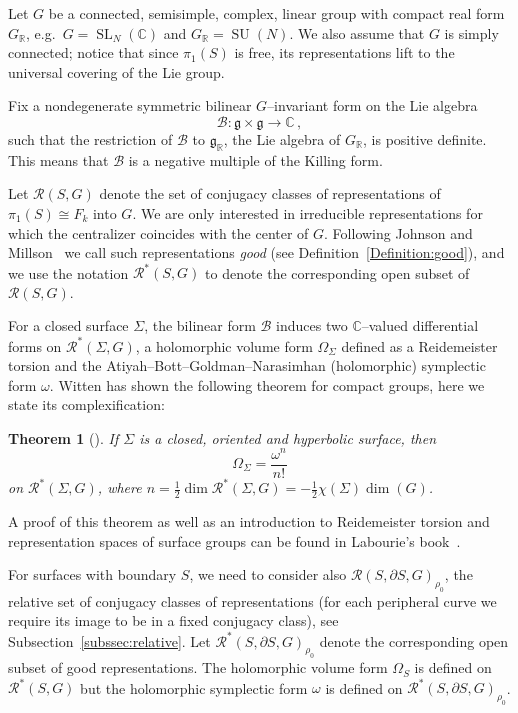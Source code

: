\documentclass[11pt]{article}
\newtheorem{theo}{Theorem}[section]
\theoremstyle{definition}
\numberwithin{equation}{section}
\numberwithin{figure}{section}
\numberwithin{table}{section}
\DeclareMathOperator{\SL}{SL}
\DeclareMathOperator{\SU}{SU}
\newcommand{\Bcal}{\mathcal{B}}
\newcommand{\Rcal}{\mathcal{R}}
\newcommand{\Cbb}{\mathbb{C}}
\newcommand{\Rbb}{\mathbb {R}}
\newcommand{\gfrk}{\mathfrak{g}}
\newcommand{\SUn}{\SU(N)}
\newcommand*\Rg{\Rcal^*}
\begin{document}
Let $G$ be a connected, semisimple, complex, linear group with compact real form $G_\Rbb$, e.g.~$G=\SL_N (\Cbb)$ and $G_\Rbb=\SUn$. We also assume that $G$ is simply connected; notice that since $\pi_1(S)$ is free, its representations lift to the universal covering of the Lie group.



Fix a nondegenerate symmetric bilinear $G$--invariant form on the Lie algebra
\[
\Bcal\colon \gfrk\times \gfrk \to \Cbb\,,
\]
such that the restriction of $\Bcal$ to $\gfrk_\Rbb$, the Lie algebra of $G_\Rbb$, is positive definite. This means that $\Bcal$ is a negative multiple of the Killing form.

Let $\Rcal(S,G)$ denote the set of conjugacy classes of representations of $\pi_1(S)\cong F_k$ into $G$. We are only interested in irreducible representations for which the centralizer coincides with the center of $G$. Following Johnson and Millson~\cite{JohnsonMillson} we call such representations \emph{good} (see Definition~\ref{Definition:good}), and we use the notation $\Rg(S,G)$ to denote the corresponding open subset of $\Rcal(S,G)$.



For a closed surface $\Sigma$, the bilinear form $\Bcal$ induces two $\Cbb$--valued differential forms on $ \Rg(\Sigma,G)$, a holomorphic volume form $\Omega_\Sigma$ defined as a Reidemeister torsion and the Atiyah--Bott--Goldman--Narasimhan (holomorphic) symplectic form $\omega$. Witten has shown the following theorem for compact groups, here we state its complexification:

\begin{theo}[{\cite[Witten]{Witten}}]\label{Theorem:Witten}
If $\Sigma$ is a closed, oriented and hyperbolic surface, then
\[
\Omega_\Sigma=\frac{\omega^{n}}{n!}
\]
on $\Rg(\Sigma,G)$, where $n=\frac12\dim \Rg(\Sigma,G)=-\frac12\chi(\Sigma)\dim(G)$.
\end{theo}

A proof of this theorem as well as an introduction to Reidemeister torsion and representation spaces of surface groups can be found in Labourie's book~\cite{LabourieSG}.

For surfaces with boundary $S$, we need to consider also $\Rcal(S,\partial S,G)_{\rho_0}$, the relative set of conjugacy classes of representations (for each peripheral curve we require its image to be in a fixed conjugacy class), see Subsection~\ref{subssec:relative}. Let $\Rg(S,\partial S,G)_{\rho_0}$ denote the corresponding open subset of good representations. The holomorphic volume form $\Omega_S$ is defined on $\Rg(S,G)$ but the holomorphic symplectic form $\omega$ is defined on $\Rg(S,\partial S,G)_{\rho_0}$.
\end{document}
